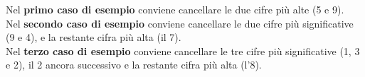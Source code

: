 \Examples
\begin{example}
%
\end{example}
\begin{example}
%
\end{example}
\begin{example}
%
\end{example}


\Explanation
Nel \textbf{primo caso di esempio} conviene cancellare le due cifre più alte (5 e 9).\\[2mm]
Nel \textbf{secondo caso di esempio} conviene cancellare le due cifre più significative (9 e 4), e la restante cifra più alta (il 7).\\[2mm]
Nel \textbf{terzo caso di esempio} conviene cancellare le tre cifre più significative (1, 3 e 2), il 2 ancora successivo e la restante cifra più alta (l'8).
